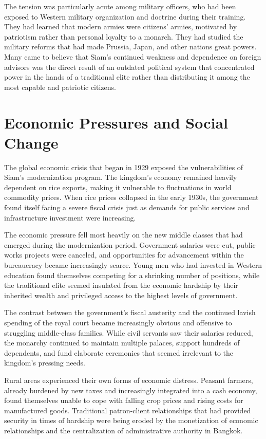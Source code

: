 \documentclass[
  Letterpaper,
]{scrbook}
\begin{document}
The tension was particularly acute among military officers, who had been
exposed to Western military organization and doctrine during their
training. They had learned that modern armies were citizens' armies,
motivated by patriotism rather than personal loyalty to a monarch. They
had studied the military reforms that had made Prussia, Japan, and other
nations great powers. Many came to believe that Siam's continued
weakness and dependence on foreign advisors was the direct result of an
outdated political system that concentrated power in the hands of a
traditional elite rather than distributing it among the most capable and
patriotic citizens.

\section{Economic Pressures and Social
Change}\label{economic-pressures-and-social-change}

The global economic crisis that began in 1929 exposed the
vulnerabilities of Siam's modernization program. The kingdom's economy
remained heavily dependent on rice exports, making it vulnerable to
fluctuations in world commodity prices. When rice prices collapsed in
the early 1930s, the government found itself facing a severe fiscal
crisis just as demands for public services and infrastructure investment
were increasing.

The economic pressure fell most heavily on the new middle classes that
had emerged during the modernization period. Government salaries were
cut, public works projects were canceled, and opportunities for
advancement within the bureaucracy became increasingly scarce. Young men
who had invested in Western education found themselves competing for a
shrinking number of positions, while the traditional elite seemed
insulated from the economic hardship by their inherited wealth and
privileged access to the highest levels of government.

The contrast between the government's fiscal austerity and the continued
lavish spending of the royal court became increasingly obvious and
offensive to struggling middle-class families. While civil servants saw
their salaries reduced, the monarchy continued to maintain multiple
palaces, support hundreds of dependents, and fund elaborate ceremonies
that seemed irrelevant to the kingdom's pressing needs.

Rural areas experienced their own forms of economic distress. Peasant
farmers, already burdened by new taxes and increasingly integrated into
a cash economy, found themselves unable to cope with falling crop prices
and rising costs for manufactured goods. Traditional patron-client
relationships that had provided security in times of hardship were being
eroded by the monetization of economic relationships and the
centralization of administrative authority in Bangkok.
\end{document}
